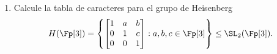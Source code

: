 \documentclass[11pt, reqno]{amsart}
\begin{document}
\begin{enumerate}

		\newex
	\item\label{ex:heisenberg_char_table}
		Calcule la tabla de caracteres para el grupo de Heisenberg
		\[
			H(\Fp[3]) =
			\left\{
				\begin{bmatrix}
					1 & a & b \\
					0 & 1 & c \\
					0 & 0 & 1
				\end{bmatrix} : a, b, c \in \Fp[3]
			\right\} \le \SL_2(\Fp[3]).
		\]
\end{enumerate}
\end{document}
